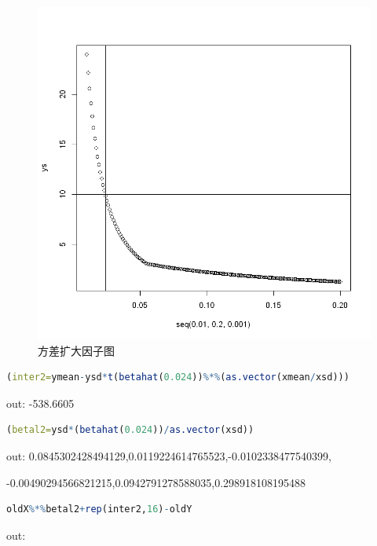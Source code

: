 \documentclass[a4paper,12pt]{article}
\begin{document}
\begin{figure}[htbp]
	\centering
	\includegraphics[scale=0.46]{output_31_0.png}
	\caption{方差扩大因子图}
\end{figure}

\begin{lstlisting}[language=r,breaklines]
(inter2=ymean-ysd*t(betahat(0.024))%*%(as.vector(xmean/xsd)))
\end{lstlisting}
out: -538.6605

\begin{lstlisting}[language=r,breaklines]
(betal2=ysd*(betahat(0.024))/as.vector(xsd))
\end{lstlisting}

out: 0.0845302428494129,0.0119224614765523,-0.0102338477540399,

-0.00490294566821215,0.0942791278588035,0.298918108195488
\begin{lstlisting}[language=r,breaklines]
oldX%*%betal2+rep(inter2,16)-oldY
\end{lstlisting}

out: 
\end{document}
